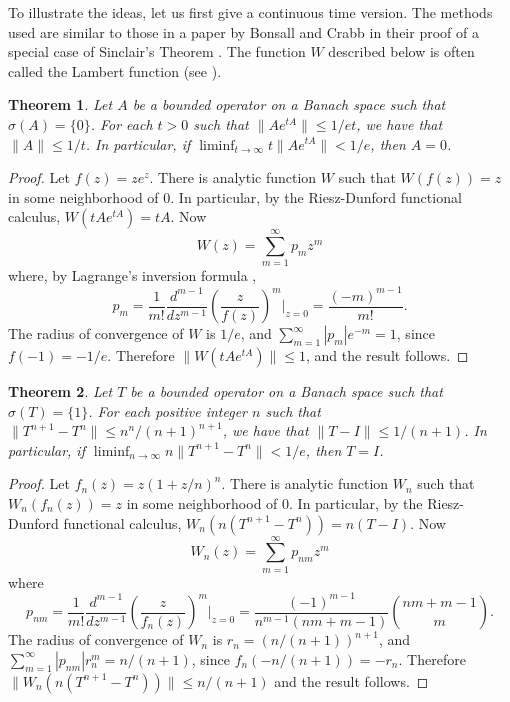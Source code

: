 \documentclass[12pt]{amsart}
\newtheorem{thm}{Theorem}[section]
\newcommand{\modo}[1]{{\left|#1\right|}}
\newcommand{\snormo}[1]{{\mathopen\|#1\mathclose\|}}
\begin{document}
To illustrate the ideas, let us first give a
continuous time version.
The methods used are similar to those in a paper by
Bonsall and Crabb \cite{bonsall-crabb} in their proof of a special case of
Sinclair's Theorem \cite{sinclair}.
The function $W$ described below is often called
the Lambert function (see \cite{corless et al}).

\begin{thm}
\label{esterle continuous}
Let $A$ be a bounded operator on a Banach space such that
$\sigma(A) = \{0\}$.  For each $t>0$ such that
$\snormo{A e^{tA}} \le 1/et$, we have that $\snormo{A} \le 1/t$.
In particular, if
$\liminf_{t\to\infty} t \snormo{Ae^{tA}} < 1/e$,
then $A = 0$.
\end{thm}

\begin{proof}
Let $f(z) = z e^z$.
There is analytic function $W$ such that
$W(f(z)) = z$ in some neighborhood of $0$.  In particular,
by the Riesz-Dunford functional calculus,
$W(tA e^{tA}) = tA$.
Now
$$ W(z) = \sum_{m=1}^\infty p_{m} z^m $$
where, by Lagrange's inversion formula \cite[Ch.~5, Ex.~33]{asmar},
$$ p_{m} = \frac1{m!}\frac{d^{m-1}}{dz^{m-1}} \left(\frac z{f(z)}\right)^m
            \Bigg |_{z=0}
          = \frac{(-m)^{m-1}}{m!} .$$
The radius of convergence of $W$ is $1/e$, and
$ \sum_{m=1}^\infty \modo{p_{m}} e^{-m} = 1 $,
since $f(-1) = -1/e$.
Therefore
$\snormo{W(tA e^{tA})} \le 1$, and the result follows.
\end{proof}

\begin{thm}
\label{esterle}
Let $T$ be a bounded operator on a Banach space such that
$\sigma(T) = \{1\}$.  For each positive integer $n$ such that
$\snormo{T^{n+1}-T^n} \le n^n/(n+1)^{n+1}$, we have that
$\snormo{T-I} \le 1/(n+1)$.  In particular, if
$\liminf_{n\to\infty} n \snormo{T^{n+1}-T^n} < 1/e$,
then $T = I$.
\end{thm}

\begin{proof}
Let $f_n(z) = z(1+z/n)^n$.
There is analytic function $W_n$ such that
$W_n(f_n(z)) = z$ in some neighborhood of $0$.  In particular,
by the Riesz-Dunford functional calculus,
$W_n(n(T^{n+1}-T^n)) = n(T-I)$.
Now
$$ W_n(z) = \sum_{m=1}^\infty p_{nm} z^m $$
where
$$ p_{nm} = \frac1{m!}\frac{d^{m-1}}{dz^{m-1}} \left(\frac z{f_n(z)}\right)^m
            \Bigg |_{z=0}
          = \frac{(-1)^{m-1}}{n^{m-1} (nm+m-1)}
            \binom{nm+m-1}m .$$
The radius of convergence of $W_n$ is $r_n = (n/(n+1))^{n+1}$, and
$\sum_{m=1}^\infty \modo{p_{nm}} r_n^m = n/(n+1)$,
since $f_n(-n/(n+1)) = -r_n$.
Therefore
$\snormo{W_n(n(T^{n+1}-T^n))} \le n/(n+1)$
and the result follows.
\end{proof}
\end{document}
